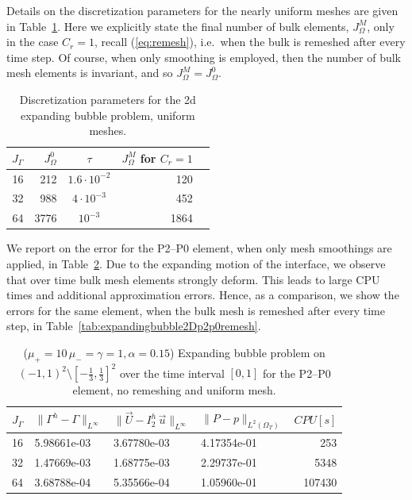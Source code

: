 \documentclass[a4paper,11pt,onecolumn]{article}
\newcommand{\errorXx}{\|\Gamma^h - \Gamma\|_{L^\infty}}
\newcommand{\errorUu}[1]{\|\vec U - I^h_{#1}\,\vec u\|_{L^\infty}}
\newcommand{\LerrorPp}{\|P - p\|_{L^2(\Omega_T)}}
\begin{document}
Details on the discretization parameters for the nearly uniform meshes are
given in Table~\ref{tab:expandingbubble2Delements}. Here we explicitly
state the final number of bulk elements, $J_\Omega^M$, only in the case
$C_r = 1$, recall (\ref{eq:remesh}), i.e.\ when the bulk is remeshed after
every time step. Of course, when only smoothing is employed, then the number of
bulk mesh elements is invariant, and so $J_\Omega^M = J_\Omega^0$.
\begin{table}
\center
\begin{tabular}{rrcrr}
\hline
$J_\Gamma$ & $J_\Omega^0$ & $\tau$ & $J_\Omega^M$ for $C_r=1$ \\
\hline
16 &  212 & $1.6\cdot10^{-2}$ &  120 \\
32 &  988 &   $4\cdot10^{-3}$ &  452 \\
64 & 3776 &         $10^{-3}$ & 1864 \\
\hline
\end{tabular}
\caption{Discretization parameters for the 2d expanding bubble problem,
uniform meshes.}
\label{tab:expandingbubble2Delements}
\end{table}
We report on the error for the P2--P0 element, when only mesh smoothings are
applied, in Table~\ref{tab:expandingbubble2Dp2p0smooth}. Due to the expanding
motion of the interface, we observe that over time bulk mesh elements strongly
deform. This leads to large CPU times and additional approximation errors.
Hence, as a comparison, we show the errors for the same element, when the bulk
mesh is remeshed after every time step, in
Table~\ref{tab:expandingbubble2Dp2p0remesh}.
\begin{table}
 \center
\begin{tabular}{llllr}
\hline
$J_\Gamma$ & $\errorXx$ & $\errorUu2$ & $\LerrorPp$ & $CPU[s]$\\
\hline
16 & 5.98661e-03 & 3.67780e-03 & 4.17354e-01 &    253 \\
32 & 1.47669e-03 & 1.68775e-03 & 2.29737e-01 &   5348 \\
64 & 3.68788e-04 & 5.35566e-04 & 1.05960e-01 & 107430 \\
\hline
\end{tabular}
\caption{($\mu_+ = 10\,\mu_- = \gamma = 1,\alpha = 0.15$) Expanding bubble
problem on $(-1,1)^2\setminus[-\frac{1}{3},\frac{1}{3}]^2$ over the time
interval $[0,1]$ for the P2--P0 element, no remeshing and uniform mesh.}
\label{tab:expandingbubble2Dp2p0smooth}
\end{table}
\end{document}
